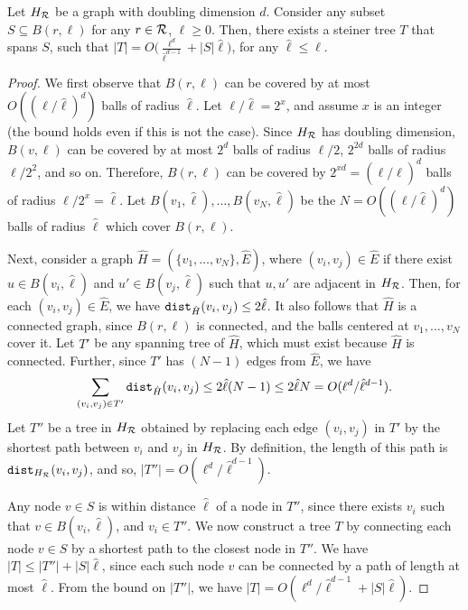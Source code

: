 \begin{lemma}
\label{lemma:udg}
Let $H_{\mathcal{R}}$ be a graph with doubling dimension $d$.
Consider any subset $S\subseteq B(r, \ell)$ for any $r\in\mathcal{R}$, $\ell\geq 0$.
Then, there exists a steiner tree $T$ that spans $S$, such that $|T|=O\Big(\frac{\ell^d}{\hat{\ell}^{d-1}}+|S|\hat{\ell}\Big)$, for any $\hat{\ell}\leq\ell$.
\end{lemma}

\begin{proof} 
\vspace{-.11in}
We first observe that $B(r, \ell)$ can be covered by at most $O((\ell/\hat{\ell})^d)$ balls of radius $\hat{\ell}$. Let $\ell/\hat{\ell}=2^x$, and assume $x$ is an integer (the bound holds even if this is not the case). Since $H_{\mathcal{R}}$ has doubling dimension, $B(v, \ell)$ can be covered by at most $2^d$ balls of radius $\ell/2$, $2^{2d}$ balls of radius $\ell/2^2$, and so on. Therefore, $B(r, \ell)$ can be covered by $2^{xd}=(\ell/\hat{\ell})^d$ balls of radius $\ell/2^x=\hat{\ell}$. Let $B(v_1,\hat{\ell}),\ldots,B(v_N,\hat{\ell})$ be the $N=O((\ell/\hat{\ell})^d)$ balls of radius $\hat{\ell}$ which cover $B(r, \ell)$.

Next, consider a graph $\hat{H}=(\{v_1,\ldots,v_N\},\hat{E})$, where $(v_i, v_j)\in\hat{E}$ if there exist $u\in B(v_i, \hat{\ell})$ and $u'\in B(v_j, \hat{\ell})$ such that $u, u'$ are adjacent in $H_{\mathcal{R}}$. Then, for each $(v_i, v_j)\in \hat{E}$, we have $\texttt{dist}_{\hat{H}}(v_i, v_j)\leq 2\hat{\ell}$. 
It also follows that $\hat{H}$ is a connected graph, since $B(r, \ell)$ is connected, and the balls centered at $v_1,\ldots,v_N$ cover it. Let $T'$ be any spanning tree of $\hat{H}$, which must exist because $\hat{H}$ is connected. Further, since $T'$ has $(N-1)$ edges from $\hat{E}$, we have $$
\sum_{(v_i, v_j)\in T'}\texttt{dist}_{\hat{H}}(v_i, v_j)\leq 2\hat{\ell}(N-1)\leq 2\hat{\ell}N=O(\ell^d/\hat{\ell}^{d-1}).
$$
Let $T''$ be a tree in $H_{\mathcal{R}}$ obtained by replacing each edge $(v_i, v_j)$ in $T'$ by the shortest path between $v_i$ and $v_j$ in $H_{\mathcal{R}}$. By definition, the length of this path is $\texttt{dist}_{H_{\mathcal{R}}}(v_i, v_j)$, and so, $|T''|=O(\ell^d/\hat{\ell}^{d-1})$.

Any node $v\in S$ is within distance $\hat{\ell}$ of a node in $T''$, since there exists $v_i$ such that $v\in B(v_i, \hat{\ell})$, and $v_i\in T''$. We now construct a tree $T$ by connecting each node $v\in S$ by a shortest path to the closest node in $T''$. We have $|T|\leq |T''|+|S|\hat{\ell}$, since each such node $v$ can be connected by a path of length at most $\hat{\ell}$. From the bound on $|T''|$, we have $|T|=O(\ell^d/\hat{\ell}^{d-1}+|S|\hat{\ell})$.
\end{proof}


